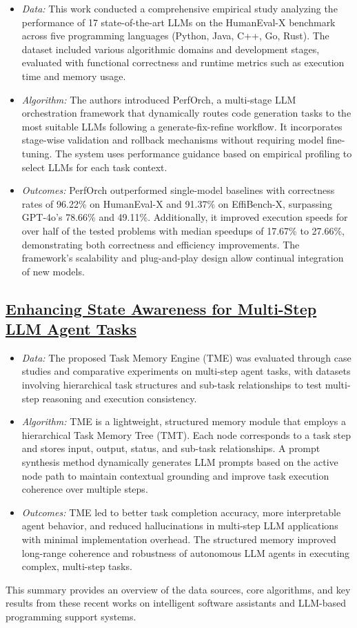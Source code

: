 \documentclass[12pt,a4paper]{article}
\begin{document}
\begin{itemize}[leftmargin=1.5em]
    \item \textit{Data:} This work conducted a comprehensive empirical study analyzing the performance of 17 
    state-of-the-art LLMs on the HumanEval-X benchmark across five programming languages (Python, Java, C++, Go, Rust). 
    The dataset included various algorithmic domains and development stages, evaluated with functional correctness and 
    runtime metrics such as execution time and memory usage.
    \item \textit{Algorithm:} The authors introduced PerfOrch, a multi-stage LLM orchestration framework that 
    dynamically routes code generation tasks to the most suitable LLMs following a generate-fix-refine workflow. It 
    incorporates stage-wise validation and rollback mechanisms without requiring model fine-tuning. The system uses 
    performance guidance based on empirical profiling to select LLMs for each task context.
    \item \textit{Outcomes:} PerfOrch outperformed single-model baselines with correctness rates of 96.22\% on 
    HumanEval-X and 91.37\% on EffiBench-X, surpassing GPT-4o’s 78.66\% and 49.11\%. Additionally, it improved execution 
    speeds for over half of the tested problems with median speedups of 17.67\% to 27.66\%, demonstrating both 
    correctness and efficiency improvements. The framework’s scalability and plug-and-play design allow continual 
    integration of new models.
\end{itemize}

\subsection{\href{https://arxiv.org/abs/2504.08525}{Enhancing State Awareness for Multi-Step LLM Agent Tasks}}

\begin{itemize}[leftmargin=1.5em]
    \item \textit{Data:} The proposed Task Memory Engine (TME) was evaluated through case studies and comparative 
    experiments on multi-step agent tasks, with datasets involving hierarchical task structures and sub-task 
    relationships to test multi-step reasoning and execution consistency.
    \item \textit{Algorithm:} TME is a lightweight, structured memory module that employs a hierarchical Task Memory 
    Tree (TMT). Each node corresponds to a task step and stores input, output, status, and sub-task relationships. A 
    prompt synthesis method dynamically generates LLM prompts based on the active node path to maintain contextual 
    grounding and improve task execution coherence over multiple steps.
    \item \textit{Outcomes:} TME led to better task completion accuracy, more interpretable agent behavior, and reduced 
    hallucinations in multi-step LLM applications with minimal implementation overhead. The structured memory improved 
    long-range coherence and robustness of autonomous LLM agents in executing complex, multi-step tasks.
\end{itemize}

This summary provides an overview of the data sources, core algorithms, and key results from these recent works on 
intelligent software assistants and LLM-based programming support systems.
\end{document}
